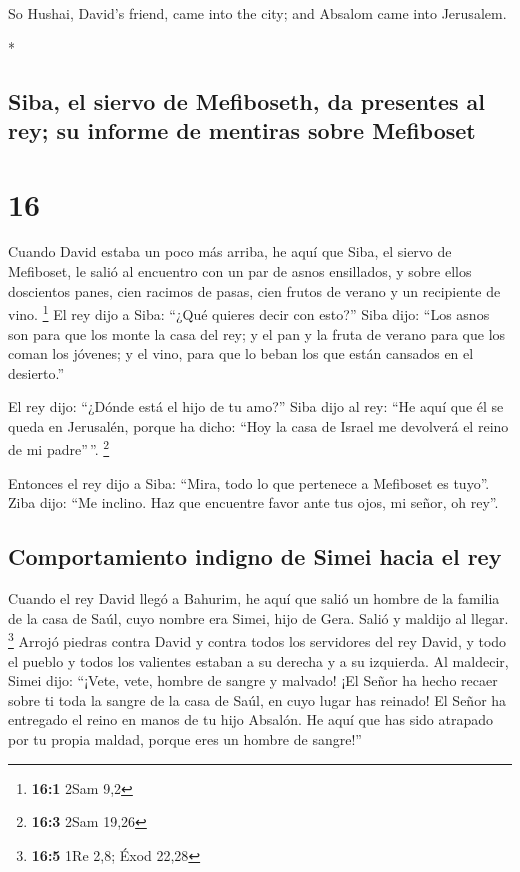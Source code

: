 \begin{paracol}{2}
\begin{otherlanguage}{english}
 So Hushai, David's friend, came into the city; and
Absalom came into Jerusalem.

\end{otherlanguage}

\switchcolumn[0]*

\hypertarget{siba-el-siervo-de-mefiboseth-da-presentes-al-rey-su-informe-de-mentiras-sobre-mefiboset}{%
\subsection{Siba, el siervo de Mefiboseth, da presentes al rey; su
informe de mentiras sobre
Mefiboset}\label{siba-el-siervo-de-mefiboseth-da-presentes-al-rey-su-informe-de-mentiras-sobre-mefiboset}}

\hypertarget{section-30}{%
\section{16}\label{section-30}}

 Cuando David estaba un poco más arriba, he aquí que Siba,
el siervo de Mefiboset, le salió al encuentro con un par de asnos
ensillados, y sobre ellos doscientos panes, cien racimos de pasas, cien
frutos de verano y un recipiente de vino. \footnote{\textbf{16:1} 2Sam
  9,2}  El rey dijo a Siba: ``¿Qué quieres decir con
esto?'' Siba dijo: ``Los asnos son para que los monte la casa del rey; y
el pan y la fruta de verano para que los coman los jóvenes; y el vino,
para que lo beban los que están cansados en el desierto.''

 El rey dijo: ``¿Dónde está el hijo de tu amo?'' Siba dijo
al rey: ``He aquí que él se queda en Jerusalén, porque ha dicho: ``Hoy
la casa de Israel me devolverá el reino de mi padre''\,''. \footnote{\textbf{16:3}
  2Sam 19,26}

 Entonces el rey dijo a Siba: ``Mira, todo lo que
pertenece a Mefiboset es tuyo''. Ziba dijo: ``Me inclino. Haz que
encuentre favor ante tus ojos, mi señor, oh rey''.

\hypertarget{comportamiento-indigno-de-simei-hacia-el-rey}{%
\subsection{Comportamiento indigno de Simei hacia el
rey}\label{comportamiento-indigno-de-simei-hacia-el-rey}}

 Cuando el rey David llegó a Bahurim, he aquí que salió un
hombre de la familia de la casa de Saúl, cuyo nombre era Simei, hijo de
Gera. Salió y maldijo al llegar. \footnote{\textbf{16:5} 1Re 2,8; Éxod
  22,28}  Arrojó piedras contra David y contra todos los
servidores del rey David, y todo el pueblo y todos los valientes estaban
a su derecha y a su izquierda.  Al maldecir, Simei dijo:
``¡Vete, vete, hombre de sangre y malvado!  ¡El Señor ha
hecho recaer sobre ti toda la sangre de la casa de Saúl, en cuyo lugar
has reinado! El Señor ha entregado el reino en manos de tu hijo Absalón.
He aquí que has sido atrapado por tu propia maldad, porque eres un
hombre de sangre!''


\end{paracol}
